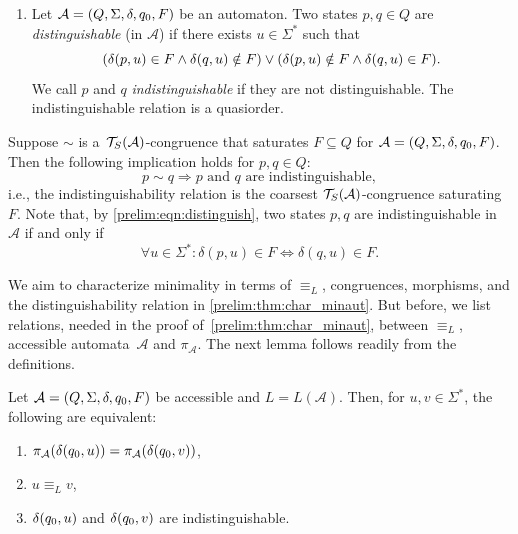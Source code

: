 \begin{enumerate}
\item Let $\mathcal A = (Q, \Sigma, \delta, q_0, F)$ be an automaton. 
Two states $p, q \in Q$ are \emph{distinguishable} (in $\mathcal A$) 
if there exists $u \in \Sigma^*$
such that 
\begin{equation}\label{prelim:eqn:distinguish}
	( \delta(p,u) \in F \land  \delta(q,u) \notin F )
	\lor 
	( \delta(p,u) \notin F \land \delta(q,u) \in F ).
\end{equation}
We call $p$ and $q$ \emph{indistinguishable} if they are not distinguishable. The indistinguishable relation
is a quasiorder.
\end{enumerate}

Suppose $\sim$ is a~$\mathcal T_S(\mathcal A)$-congruence that saturates $F \subseteq Q$
for  $\mathcal A = (Q, \Sigma, \delta, q_0, F)$.
Then the following implication holds for $p,q \in Q$:
\begin{equation} \label{prelim:eqn:congruence-implies-indist}
	p \sim q \Rightarrow \text{$p$ and $q$ are indistinguishable},
\end{equation}
i.e., the indistinguishability relation is the coarsest $\mathcal T_S(\mathcal A)$-congruence
saturating~$F$. Note that, by \cref{prelim:eqn:distinguish}, two states $p,q$
are indistinguishable in $\mathcal A$ if and only if
\[
 \forall u \in \Sigma^* \colon \delta(p, u) \in F \Leftrightarrow \delta(q, u) \in F.
\]

We aim to characterize minimality in terms of $\equiv_L$, congruences,
morphisms, and the distinguishability relation in \cref{prelim:thm:char_minaut}.
But before, %
we list relations, needed in the proof of~\cref{prelim:thm:char_minaut}, between $\equiv_L$, accessible automata~$\mathcal A$ and $\pi_{\mathcal A}$. The next 
lemma follows readily from the definitions.

\begin{lemma}\label{prelim:lem:indist}
	Let $\mathcal A = (Q, \Sigma, \delta, q_0, F)$ be accessible and $L = L(\mathcal A)$. 
	Then, for $u,v \in \Sigma^*$, the following are equivalent:	
	\begin{enumerate}
		\item $\pi_{\mathcal A}(\delta(q_0,u)) = \pi_{\mathcal A}(\delta(q_0,v))$,
		
		\item $u \equiv_L v$, 
		
		\item $\delta(q_0,u)$ and $\delta(q_0,v)$ are indistinguishable.
	\end{enumerate}
\end{lemma}

